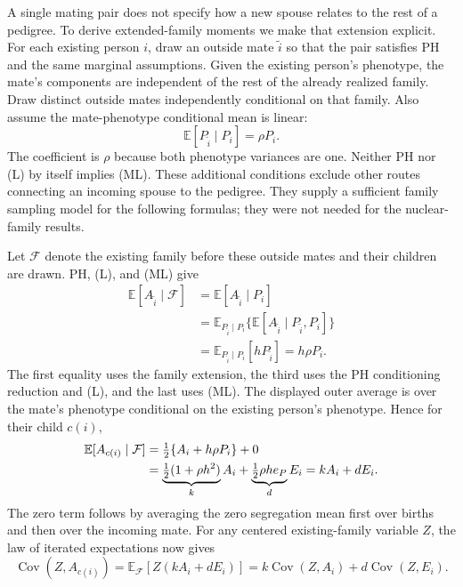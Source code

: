 A single mating pair does not specify how a new spouse relates to the
rest of a pedigree. To derive extended-family moments we make that
extension explicit. For each existing person $i$, draw an outside mate
$\widetilde i$ so that the pair satisfies PH and the same marginal
assumptions. Given the existing person's phenotype, the mate's
components are independent of the rest of the already realized family.
Draw distinct outside mates independently conditional on that family.
Also assume the mate-phenotype conditional mean is linear:
\begin{equation}
 \mathbb E[P_{\widetilde i}\mid P_i]=\rho P_i.
 \tag{ML}\label{eq:model-mate-linearity}
\end{equation}
The coefficient is $\rho$ because both phenotype variances are one.
Neither PH nor (L) by itself implies (ML). These additional conditions
exclude other routes connecting an incoming spouse to the pedigree.
They supply a sufficient family sampling model for the following
formulas; they were not needed for the nuclear-family results.

Let $\mathcal F$ denote the existing family before these outside mates
and their children are drawn. PH, (L), and (ML) give
\begin{align*}
 \mathbb E[A_{\widetilde i}\mid\mathcal F]
 &=\mathbb E[A_{\widetilde i}\mid P_i]\\
 &=\mathbb E_{P_{\widetilde i}\mid P_i}
       \{\mathbb E[A_{\widetilde i}\mid P_{\widetilde i},P_i]\}\\
 &=\mathbb E_{P_{\widetilde i}\mid P_i}[hP_{\widetilde i}]
   =h\rho P_i.
\end{align*}
The first equality uses the family extension, the third uses the
PH conditioning reduction and (L), and the last uses (ML).
The displayed outer average is over the mate's phenotype conditional
on the existing person's phenotype. Hence for their child $c(i)$,
\begin{align}
 \mathbb E[A_{c(i)}\mid\mathcal F]
 &=\tfrac12\{A_i+h\rho P_i\}+0\notag\\
 &=\underbrace{\tfrac12(1+\rho h^2)}_{k}A_i
   +\underbrace{\tfrac12\rho h e_P}_{d}E_i
   =kA_i+dE_i.
 \label{eq:model-child-mean}
\end{align}
The zero term follows by averaging the zero segregation mean first
over births and then over the incoming mate. For any centered
existing-family variable $Z$, the law of iterated expectations now gives
\[
 \operatorname{Cov}(Z,A_{c(i)})
 =\mathbb E_{\mathcal F}[Z(kA_i+dE_i)]
 =k\operatorname{Cov}(Z,A_i)+d\operatorname{Cov}(Z,E_i).
\]

